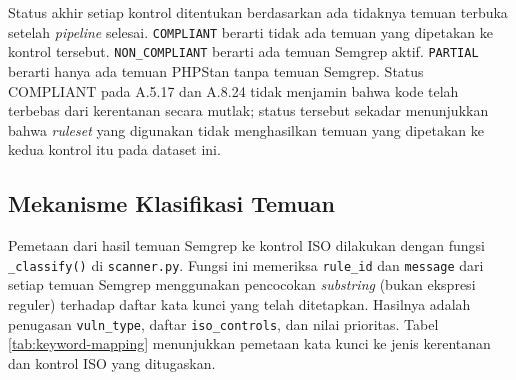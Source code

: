 Status akhir setiap kontrol ditentukan berdasarkan ada tidaknya temuan terbuka setelah \textit{pipeline} selesai. \texttt{COMPLIANT} berarti tidak ada temuan yang dipetakan ke kontrol tersebut. \texttt{NON\_COMPLIANT} berarti ada temuan Semgrep aktif. \texttt{PARTIAL} berarti hanya ada temuan PHPStan tanpa temuan Semgrep. Status COMPLIANT pada A.5.17 dan A.8.24 tidak menjamin bahwa kode telah terbebas dari kerentanan secara mutlak; status tersebut sekadar menunjukkan bahwa \textit{ruleset} yang digunakan tidak menghasilkan temuan yang dipetakan ke kedua kontrol itu pada dataset ini.
\newpage
\subsection{Mekanisme Klasifikasi Temuan}

Pemetaan dari hasil temuan Semgrep ke kontrol ISO dilakukan dengan fungsi
\texttt{\_classify()} di \texttt{scanner.py}. Fungsi ini memeriksa
\texttt{rule\_id} dan \texttt{message} dari setiap temuan Semgrep
menggunakan pencocokan \textit{substring} (bukan ekspresi reguler)
terhadap daftar kata kunci yang telah ditetapkan. Hasilnya adalah
penugasan \texttt{vuln\_type}, daftar \texttt{iso\_controls}, dan
nilai prioritas. Tabel \ref{tab:keyword-mapping} menunjukkan pemetaan
kata kunci ke jenis kerentanan dan kontrol ISO yang ditugaskan.

